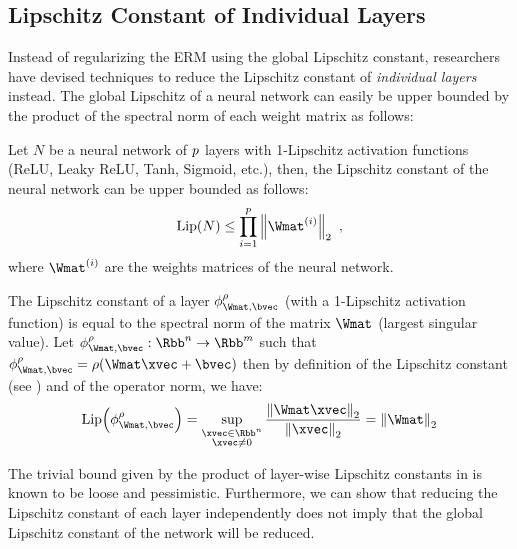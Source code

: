 \subsection{Lipschitz Constant of Individual Layers}
\label{subsection:ch3-lipschitz_constant_of_individual_layers}

\noindent
Instead of regularizing the ERM using the global Lipschitz constant, researchers have devised techniques to reduce the Lipschitz constant of \emph{individual layers} instead. 
The global Lipschitz of a neural network can easily be upper bounded by the product of the spectral norm of each weight matrix as follows:
\begin{proposition} \label{proposition:ch3-naive_upper_bound_lipschitz}
  Let $N$ be a neural network of $p$ layers with 1-Lipschitz activation functions (\eg ReLU,
  Leaky ReLU, Tanh, Sigmoid, etc.), then, the Lipschitz constant of the neural network can be upper bounded as follows:
  \begin{equation} \label{equation:ch3-naive_upper_bound_lipschitz}
    \lip{N} \leq \prod_{i=1}^\depth \norm{\Wmat^{(i)}}_2 \enspace,
  \end{equation}
  where $\Wmat^{(i)}$ are the weights matrices of the neural network.
\end{proposition}

\begin{remark}
  The Lipschitz constant of a layer $\layer_{\Wmat, \bvec}^\rho$ (with a 1-Lipschitz activation function) is equal to the spectral norm of the matrix $\Wmat$ (largest singular value).
  Let $\layer_{\Wmat, \bvec}^\rho: \Rbb^n \rightarrow \Rbb^m$ such that $\layer_{\Wmat, \bvec}^\rho = \rho(\Wmat \xvec + \bvec)$ then by definition of the Lipschitz constant (see ) and of the operator norm, we have:
  \begin{equation}
    \lip{\layer_{\Wmat, \bvec}^\rho} = \sup_{\substack{\xvec \in \Rbb^n \\ \xvec \neq 0}} \frac{\norm{\Wmat \xvec}_2}{\norm{\xvec}_2} = \norm{\Wmat}_2
  \end{equation}
  \removespace
\end{remark}

The trivial bound given by the product of layer-wise Lipschitz constants in  is known to be loose and pessimistic.
Furthermore, we can show that reducing the Lipschitz constant of each layer independently does not imply that the global Lipschitz constant of the network will be reduced. 




